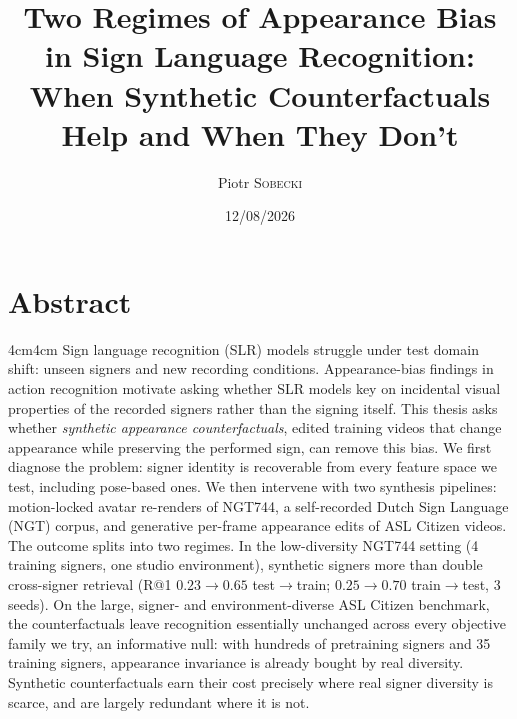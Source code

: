 \documentclass[openany]{mscaithesis}  %
\title{Two Regimes of Appearance Bias in Sign Language Recognition:\\
When Synthetic Counterfactuals Help and When They Don't}
\date{12/08/2026}
\author{Piotr \textsc{Sobecki}}
\begin{document}
\maketitle

\frontmatter
        \chapter*{Abstract}
                \begin{adjustwidth}{4cm}{4cm}
Sign language recognition (SLR) models struggle under test domain shift:
unseen signers and new recording conditions. Appearance-bias findings in action
recognition motivate asking whether SLR models key on incidental visual
properties of the recorded signers rather than the signing itself. This thesis asks
whether \emph{synthetic appearance counterfactuals}, edited training
videos that change appearance while preserving the performed sign, can
remove this bias. We first diagnose the problem: signer
identity is recoverable from every feature space we test, including
pose-based ones. We then intervene with two synthesis pipelines:
motion-locked avatar re-renders of NGT744, a self-recorded Dutch Sign
Language (NGT) corpus, and generative per-frame appearance edits of ASL
Citizen videos. The outcome splits into two regimes.
In the low-diversity NGT744 setting (4 training signers, one studio
environment), synthetic signers more than double cross-signer retrieval (R@1 $0.23 \to 0.65$ test$\to$train;
$0.25 \to 0.70$ train$\to$test, 3 seeds). On the large, signer- and
environment-diverse ASL Citizen benchmark, the counterfactuals leave
recognition essentially unchanged across every objective family we try,
an informative null: with hundreds of pretraining signers and 35
training signers, appearance invariance is already bought by real
diversity.
Synthetic counterfactuals earn their cost precisely where real signer
diversity is scarce, and are largely redundant where it is not.
\end{adjustwidth}

\tableofcontents

\listoffigures

\listoftables



\setlength{\parskip}{5pt}

\twocolumn
\mainmatter
        
        
        
        
        
        




\onecolumn
\appendix
        
\end{document}
